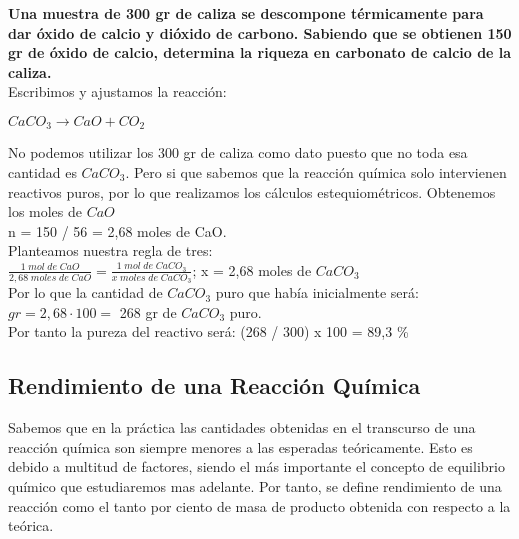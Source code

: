 \begin{exercise}
	\textbf{Una muestra de 300 gr de caliza se descompone térmicamente para dar óxido de calcio y dióxido de carbono. Sabiendo que se obtienen 150 gr de óxido de calcio, determina la riqueza en carbonato de calcio de la caliza.}\\
	
	Escribimos y ajustamos la reacción:\\
	
	\begin{center}
		$CaCO_3 \longrightarrow CaO + CO_2$\\
	\end{center}

No podemos utilizar los 300 gr de caliza como dato puesto que no toda esa cantidad es $CaCO_3$. Pero si que sabemos que la reacción química solo intervienen reactivos puros, por lo que realizamos los cálculos estequiométricos. Obtenemos los moles de $CaO$\\

n = 150 / 56 = 2,68 moles de CaO.\\

Planteamos nuestra regla de tres:\\

$\frac{1 \; mol\; de\; CaO}{2,68 \; moles\; de\; CaO}=\frac{1 \; mol \; de \; CaCO_3}{x \; moles \; de \; CaCO_3}$; x = 2,68 moles de $CaCO_3$\\

Por lo que la cantidad de $CaCO_3$ puro que había inicialmente será:\\

$gr = 2,68 \cdot 100 =$ 268 gr de $CaCO_3$ puro.\\

Por tanto la pureza del reactivo será: (268 / 300) x 100 = 89,3 \%

\end{exercise}

\subsection{Rendimiento de una Reacción Química}

Sabemos que en la práctica las cantidades obtenidas en el transcurso de una reacción química son siempre menores a las esperadas teóricamente. Esto es debido a multitud de factores, siendo el más importante el concepto de equilibrio químico que estudiaremos mas adelante. Por tanto, se define rendimiento de una reacción como el tanto por ciento de masa de producto obtenida con respecto a la teórica. 

